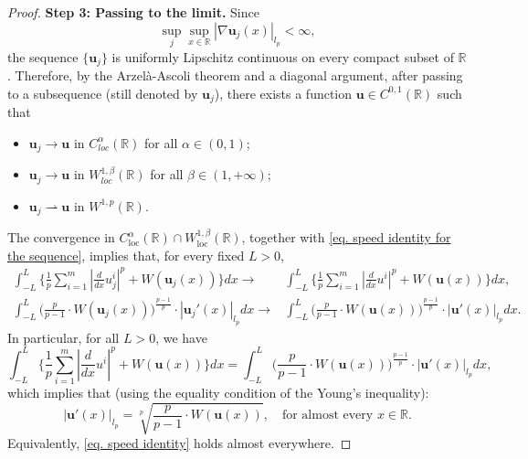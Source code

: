 \documentclass[11pt,twoside,reqno]{amsart}
\numberwithin{equation}{section}
\begin{document}
\begin{proof}
    \textbf{Step 3: Passing to the limit.} Since 
    \[
    \sup_j\sup_{x\in\mathbb{R}}
    |\nabla\mathbf{u}_j(x)|_{l_p}<\infty,
\]
the sequence $\{\mathbf{u}_j\}$ is uniformly Lipschitz continuous on
every compact subset of $\mathbb{R}$. Therefore, by the
Arzel\`a-Ascoli theorem and a diagonal argument, after passing to a
subsequence (still denoted by $\mathbf{u}_j$), there exists a function
$\mathbf{u}\in C^{0,1}(\mathbb{R})$ such that
    \begin{itemize}
        \item $\mathbf{u}_{j}\to\mathbf{u}$ in $C^{\alpha}_{loc}(\mathbb{R})$ for all $\alpha\in(0,1)$;
        \item $\mathbf{u}_{j}\to\mathbf{u}$ in $W^{1,\beta}_{loc}(\mathbb{R})$ for all $\beta\in(1,+\infty)$;
        \item $\mathbf{u}_{j}\rightharpoonup\mathbf{u}$ in $W^{1,p}(\mathbb{R})$.
    \end{itemize}
    The convergence in
$C^\alpha_{\mathrm{loc}}(\mathbb{R})\cap W^{1,\beta}_{\mathrm{loc}}(\mathbb{R})$,
together with \eqref{eq. speed identity for the sequence}, implies that,
for every fixed $L>0$,
    \begin{align*}
        \int_{-L}^{L}\Big\{\frac{1}{p}\sum_{i=1}^{m}|\frac{d}{dx}u_{j}^{i}|^{p}+W(\mathbf{u}_{j}(x))\Big\}dx\to&\int_{-L}^{L}\Big\{\frac{1}{p}\sum_{i=1}^{m}|\frac{d}{dx}u^{i}|^{p}+W(\mathbf{u}(x))\Big\}dx,\\
        \int_{-L}^{L}\Big(\frac{p}{p-1}\cdot W(\mathbf{u}_{j}(x))\Big)^{\frac{p-1}{p}}\cdot|\mathbf{u}_{j}'(x)|_{l_{p}}dx\to&\int_{-L}^{L}\Big(\frac{p}{p-1}\cdot W(\mathbf{u}(x))\Big)^{\frac{p-1}{p}}\cdot|\mathbf{u}'(x)|_{l_{p}}dx.
    \end{align*}
    In particular, for all $L>0$, we have
    \begin{equation*}
        \int_{-L}^{L}\Big\{\frac{1}{p}\sum_{i=1}^{m}|\frac{d}{dx}u^{i}|^{p}+W(\mathbf{u}(x))\Big\}dx=\int_{-L}^{L}\Big(\frac{p}{p-1}\cdot W(\mathbf{u}(x))\Big)^{\frac{p-1}{p}}\cdot|\mathbf{u}'(x)|_{l_{p}}dx,
    \end{equation*}
    which implies that (using the equality condition of the Young's inequality):
    \begin{equation}\label{eq. speed identity almost everywhere}
        |\mathbf{u}'(x)|_{l_{p}}=\sqrt[p]{\frac{p}{p-1}\cdot W(\mathbf{u}(x))},\quad\mbox{for almost every } x\in\mathbb{R}.
    \end{equation}
   Equivalently, \eqref{eq. speed identity} holds almost everywhere.


\end{proof}
\end{document}
